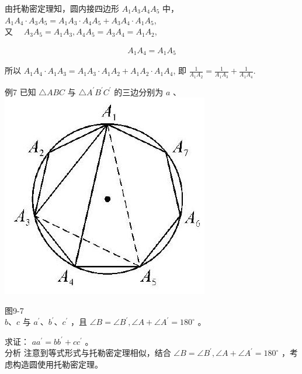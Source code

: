 \documentclass[10pt]{article}
\begin{document}
由托勒密定理知，圆内接四边形 $A_{1} A_{3} A_{4} A_{5}$ 中，\\
$A_{1} A_{4} \cdot A_{3} A_{5}=A_{1} A_{3} \cdot A_{4} A_{5}+A_{3} A_{4} \cdot A_{1} A_{5}$,\\
又 $\quad A_{3} A_{5}=A_{1} A_{3}, A_{4} A_{5}=A_{3} A_{4}=A_{1} A_{2}$,

\begin{align*}
A_{1} A_{4}=A_{1} A_{5}
\end{align*}

所以 $A_{1} A_{4} \cdot A_{1} A_{3}=A_{1} A_{3} \cdot A_{1} A_{2}+A_{1} A_{2} \cdot A_{1} A_{4}$, 即 $\frac{1}{A_{1} A_{2}}=\frac{1}{A_{1} A_{3}}+\frac{1}{A_{1} A_{4}}$.

例7 已知 $\triangle A B C$ 与 $\triangle A^{\prime} B^{\prime} C^{\prime}$ 的三边分别为 $a$ 、\\
\includegraphics[max width=\textwidth, center]{2024_10_30_66b8e5e701da2093c133g-068(1)}

图9-7\\
$b 、 c$ 与 $a^{\prime} 、 b^{\prime} 、 c^{\prime}$ ，且 $\angle B=\angle B^{\prime}, \angle A+\angle A^{\prime}=180^{\circ}$ 。

求证： $a a^{\prime}=b b^{\prime}+c c^{\prime}$ 。\\
分析 注意到等式形式与托勒密定理相似，结合 $\angle B=\angle B^{\prime}, \angle A+\angle A^{\prime}=180^{\circ}$ ，考虑构造圆使用托勒密定理。
\end{document}
